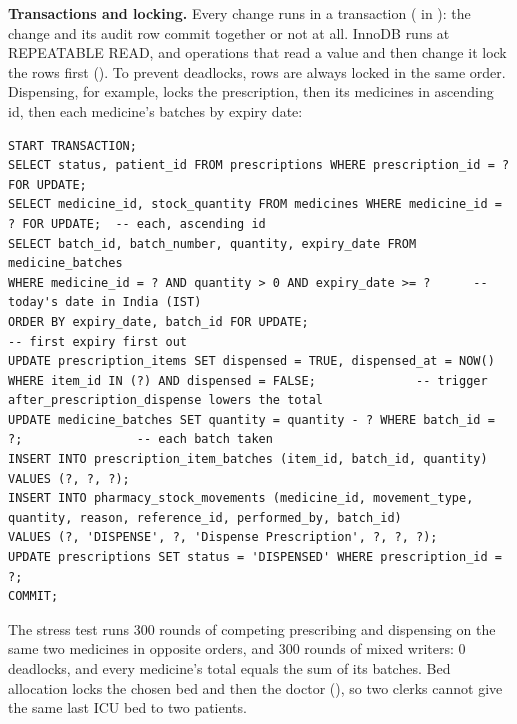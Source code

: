 \textbf{Transactions and locking.} Every change runs in a transaction ( in
): the change and its audit row commit together or not at all. InnoDB runs at REPEATABLE
READ, and operations that read a value and then change it lock the rows first ().
To prevent deadlocks, rows are always locked in the same order. Dispensing, for example, locks the prescription,
then its medicines in ascending id, then each medicine's batches by expiry date:
\begin{lstlisting}[caption={Lock order in one dispensing transaction (\tbl{dispenseService})}]
START TRANSACTION;
SELECT status, patient_id FROM prescriptions WHERE prescription_id = ? FOR UPDATE;
SELECT medicine_id, stock_quantity FROM medicines WHERE medicine_id = ? FOR UPDATE;  -- each, ascending id
SELECT batch_id, batch_number, quantity, expiry_date FROM medicine_batches
WHERE medicine_id = ? AND quantity > 0 AND expiry_date >= ?      -- today's date in India (IST)
ORDER BY expiry_date, batch_id FOR UPDATE;                                          -- first expiry first out
UPDATE prescription_items SET dispensed = TRUE, dispensed_at = NOW()
WHERE item_id IN (?) AND dispensed = FALSE;              -- trigger after_prescription_dispense lowers the total
UPDATE medicine_batches SET quantity = quantity - ? WHERE batch_id = ?;                -- each batch taken
INSERT INTO prescription_item_batches (item_id, batch_id, quantity) VALUES (?, ?, ?);
INSERT INTO pharmacy_stock_movements (medicine_id, movement_type, quantity, reason, reference_id, performed_by, batch_id)
VALUES (?, 'DISPENSE', ?, 'Dispense Prescription', ?, ?, ?);
UPDATE prescriptions SET status = 'DISPENSED' WHERE prescription_id = ?;
COMMIT;
\end{lstlisting}
The stress test runs 300 rounds of competing prescribing and dispensing on the same two medicines in opposite
orders, and 300 rounds of mixed writers: 0 deadlocks, and every medicine's total equals the sum of its batches.
Bed allocation locks the chosen bed and then the doctor (), so two clerks cannot give the same
last ICU bed to two patients.
